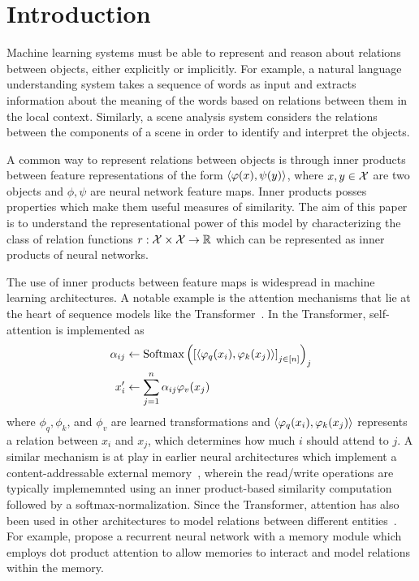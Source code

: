 \section{Introduction}\label{sec:intro}


Machine learning systems must be able to represent and reason about relations between objects, either explicitly or implicitly. For example, a natural language understanding system takes a sequence of words as input and extracts information about the meaning of the words based on relations between them in the local context. Similarly, a scene analysis system considers the relations between the components of a scene in order to identify and interpret the objects.

A common way to represent relations between objects is through inner products between feature representations of the form $\left \langle \varphi(x), \psi(y) \right\rangle$, where $x, y \in {\mathcal{X}}$ are two objects and $\phi, \psi$ are neural network feature maps. Inner products posses properties which make them useful measures of similarity. The aim of this paper is to understand the representational power of this model by characterizing the class of relation functions $r: {\mathcal{X}} \times {\mathcal{X}} \to \mathbb{R}$ which can be represented as inner products of neural networks.

The use of inner products between feature maps is widespread in machine learning architectures. A notable example is the attention mechanisms that lie at the heart of sequence models like the Transformer~\parencite{vaswani2017attention}. In the Transformer, self-attention is implemented as
\begin{equation*}
    \begin{split}
        \alpha_{ij} &\gets \mathrm{Softmax}\paren{\bra{{\iprod{\phi_q(x_i)}{\phi_k(x_j)}}}_{j \in [n]}}_j\\
        x_i' &\gets \sum_{j=1}^{n} \alpha_{ij} \phi_v(x_j)
    \end{split}
\end{equation*}
where $\phi_q, \phi_k$, and $\phi_v$ are learned transformations and $\left \langle \varphi_q(x_i), \varphi_k(x_j) \right\rangle$ represents a relation between $x_i$ and $x_j$, which determines how much $i$ should attend to $j$. A similar mechanism is at play in earlier neural architectures which implement a content-addressable external memory~\parencite{gravesNeuralTuringMachines2014,gravesHybridComputingUsing2016a,pritzelNeuralEpisodicControl2017}, wherein the read/write operations are typically implememnted using an inner product-based similarity computation followed by a softmax-normalization. Since the Transformer, attention has also been used in other architectures to model relations between different entities~\parencite{velickovicGraphAttentionNetworks2017a,santoroRelationalRecurrentNeural2018,zambaldiDeepReinforcementLearning2018a,locatelloObjectCentricLearningSlot2020b}. For example, \citet{santoroRelationalRecurrentNeural2018} propose a recurrent neural network with a memory module which employs dot product attention to allow memories to interact and model relations within the memory.

